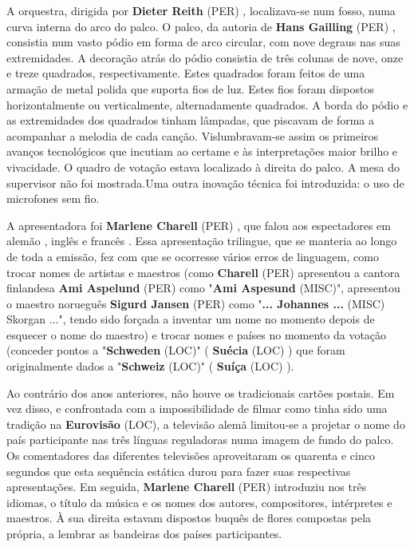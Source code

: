 \documentclass[12pt,a4paper]{article}
\begin{document}
A orquestra, dirigida por \textbf{Dieter Reith} (PER) , localizava-se num fosso, numa curva interna do arco do palco. O palco, da autoria de \textbf{Hans Gailling} (PER) , consistia num vasto pódio em forma de arco circular, com nove degraus nas suas extremidades. A decoração atrás do pódio consistia de três colunas de nove, onze e treze quadrados, respectivamente. Estes quadrados foram feitos de uma armação de metal polida que suporta fios de luz. Estes fios foram dispostos horizontalmente ou verticalmente, alternadamente quadrados. A borda do pódio e as extremidades dos quadrados tinham lâmpadas, que piscavam de forma a acompanhar a melodia de cada canção. Vislumbravam-se assim os primeiros avanços tecnológicos que incutiam ao certame e às interpretações maior brilho e vivacidade. O quadro de votação estava localizado à direita do palco. A mesa do supervisor não foi mostrada.Uma outra inovação técnica foi introduzida: o uso de microfones sem fio.

A apresentadora foi \textbf{Marlene Charell} (PER) , que falou aos espectadores em alemão , inglês e francês . Essa apresentação trilingue, que se manteria ao longo de toda a emissão, fez com que se ocorresse vários erros de linguagem, como trocar nomes de artistas e maestros (como \textbf{Charell} (PER) apresentou a cantora finlandesa \textbf{Ami Aspelund} (PER) como "\textbf{Ami Aspesund} (MISC)", apresentou o maestro norueguês \textbf{Sigurd Jansen} (PER) como "\textbf{... Johannes ...} (MISC) Skorgan ...", tendo sido forçada a inventar um nome no momento depois de esquecer o nome do maestro) e trocar nomes e países no momento da votação (conceder pontos a "\textbf{Schweden} (LOC)" ( \textbf{Suécia} (LOC) ) que foram originalmente dados a "\textbf{Schweiz} (LOC)" ( \textbf{Suíça} (LOC) ).

Ao contrário dos anos anteriores, não houve os tradicionais cartões postais. Em vez disso, e confrontada com a impossibilidade de filmar como tinha sido uma tradição na \textbf{Eurovisão} (LOC), a televisão alemã limitou-se a projetar o nome do país participante nas três línguas reguladoras numa imagem de fundo do palco. Os comentadores das diferentes televisões aproveitaram os quarenta e cinco segundos que esta sequência estática durou para fazer suas respectivas apresentações. Em seguida, \textbf{Marlene Charell} (PER) introduziu nos três idiomas, o título da música e os nomes dos autores, compositores, intérpretes e maestros. À sua direita estavam dispostos buquês de flores compostas pela própria, a lembrar as bandeiras dos países participantes.
\end{document}
